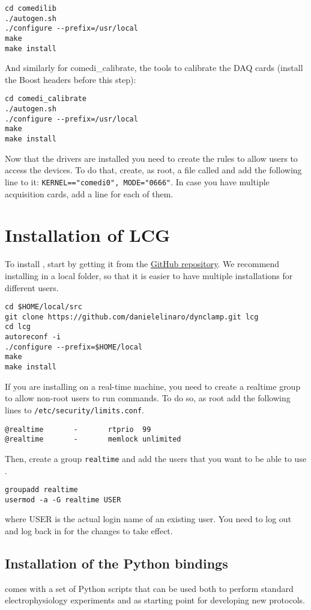 \begin{enumerate}
\begin{lstlisting}
cd comedilib
./autogen.sh
./configure --prefix=/usr/local
make
make install
\end{lstlisting}
And similarly for comedi\_calibrate, the tools to calibrate the DAQ cards (install the Boost headers before this step):
\begin{lstlisting}
cd comedi_calibrate
./autogen.sh
./configure --prefix=/usr/local
make
make install
\end{lstlisting}
Now that the drivers are installed you need to create the rules to
allow users to access the devices. To do that, create, as root, a file
called  and add the
following line to it: \texttt{KERNEL=="comedi0", MODE="0666"}. In case
you have multiple acquisition cards, add a line for each of them.
\end{enumerate}

\section{Installation of LCG}
\label{install:program}
To install \progname, start by getting it from the
\href{https://github.com/danielelinaro/dynclamp}{GitHub
  repository}. We recommend installing \progname in a local folder, so
that it is easier to have multiple installations for different users.
\begin{lstlisting}
cd $HOME/local/src
git clone https://github.com/danielelinaro/dynclamp.git lcg
cd lcg
autoreconf -i
./configure --prefix=$HOME/local
make
make install
\end{lstlisting}

If you are installing \progname on a real-time machine,
you need to create a realtime group to allow non-root
users to run \progname commands. To do so, as root add
the following lines to \texttt{/etc/security/limits.conf}.
\begin{lstlisting}
@realtime       -       rtprio  99
@realtime       -       memlock unlimited
\end{lstlisting}
Then, create a group \texttt{realtime} and add the users that you want
to be able to use \progname.
\begin{lstlisting}
groupadd realtime
usermod -a -G realtime USER
\end{lstlisting}
where USER is the actual login name of an existing user.
You need to log out and log back in for the changes to take effect.

\subsection{Installation of the Python bindings}
\progname comes with a set of Python scripts that can be used both to
perform standard electrophysiology experiments and as starting point
for developing new protocols.


